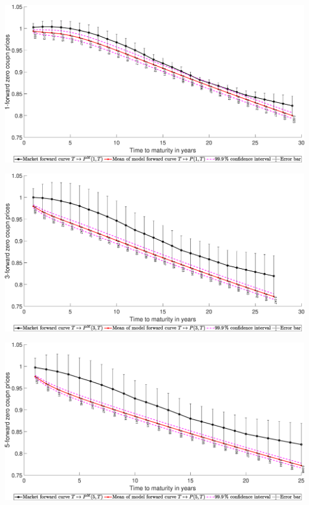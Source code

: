 \begin{landscape}
\includegraphics[width=.95\columnwidth]{Forward/F_A_1}
\end{landscape}
\begin{landscape}
\includegraphics[width=.95\columnwidth]{Forward/F_A_2}
\end{landscape}
\begin{landscape}
\includegraphics[width=.95\columnwidth]{Forward/F_A_3}
\end{landscape}
